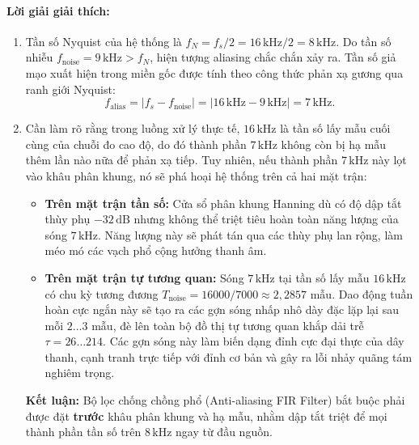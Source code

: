 \paragraph{Lời giải giải thích:}
\begin{enumerate}[label=\alph*)]
    \item Tần số Nyquist của hệ thống là $f_N = f_s / 2 = 16\,\text{kHz} / 2 = 8\,\text{kHz}$. Do tần số nhiễu $f_{\mathrm{noise}} = 9\,\text{kHz} > f_N$, hiện tượng aliasing chắc chắn xảy ra. Tần số giả mạo xuất hiện trong miền gốc được tính theo công thức phản xạ gương qua ranh giới Nyquist:
    \[
    f_{\mathrm{alias}} = |f_s - f_{\mathrm{noise}}| = |16\,\text{kHz} - 9\,\text{kHz}| = 7\,\text{kHz}.
    \]
    \item Cần làm rõ rằng trong luồng xử lý thực tế, $16\,\text{kHz}$ là tần số lấy mẫu cuối cùng của chuỗi đo cao độ, do đó thành phần $7\,\text{kHz}$ không còn bị hạ mẫu thêm lần nào nữa để phản xạ tiếp. Tuy nhiên, nếu thành phần $7\,\text{kHz}$ này lọt vào khâu phân khung, nó sẽ phá hoại hệ thống trên cả hai mặt trận:
    \begin{itemize}[leftmargin=1.2em]
        \item \textbf{Trên mặt trận tần số:} Cửa sổ phân khung Hanning dù có độ dập tắt thùy phụ $-32\,\text{dB}$ nhưng không thể triệt tiêu hoàn toàn năng lượng của sóng $7\,\text{kHz}$. Năng lượng này sẽ phát tán qua các thùy phụ lan rộng, làm méo mó các vạch phổ cộng hưởng thanh âm.
        \item \textbf{Trên mặt trận tự tương quan:} Sóng $7\,\text{kHz}$ tại tần số lấy mẫu $16\,\text{kHz}$ có chu kỳ tương đương $T_{\mathrm{noise}} = 16000 / 7000 \approx 2{,}2857$ mẫu. Dao động tuần hoàn cực ngắn này sẽ tạo ra các gợn sóng nhấp nhô dày đặc lặp lại sau mỗi $2 \ldots 3$ mẫu, đè lên toàn bộ đồ thị tự tương quan khắp dải trễ $\tau = 26 \ldots 214$. Các gợn sóng này làm biến dạng đỉnh cực đại thực của dây thanh, cạnh tranh trực tiếp với đỉnh cơ bản và gây ra lỗi nhảy quãng tám nghiêm trọng.
    \end{itemize}
    \textbf{Kết luận:} Bộ lọc chống chồng phổ (Anti-aliasing FIR Filter) bắt buộc phải được đặt \textbf{trước} khâu phân khung và hạ mẫu, nhằm dập tắt triệt để mọi thành phần tần số trên $8\,\text{kHz}$ ngay từ đầu nguồn.
\end{enumerate}

